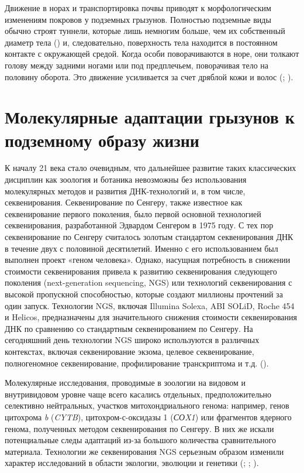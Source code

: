 
Движение в норах и транспортировка почвы приводят к морфологическим изменениям покровов у подземных грызунов. Полностью подземные виды обычно строят туннели, которые лишь немногим больше, чем их собственный диаметр тела (\cite{Andersen1982}) и, следовательно, поверхность тела находится в постоянном контакте с окружающей средой. Когда особи поворачиваются в норе, они толкают голову между задними ногами или под предплечьем, поворачивая тело на половину оборота. Это движение усиливается за счет дряблой кожи и волос (\cite{Nevo1979}; \cite{Tucker1981}). 

\section{Молекулярные адаптации грызунов к подземному образу жизни}

К началу 21 века стало очевидным, что дальнейшее развитие таких классических дисциплин как зоология и ботаника невозможны без использования молекулярных методов и развития ДНК-технологий и, в том числе, секвенирования. Секвенирование по Сенгеру, также известное как секвенирование первого поколения, было первой основной технологией секвенирования, разработанной Эдвардом Сенгером в 1975 году. С тех пор секвенирование по Сенгеру считалось золотым стандартом секвенирования ДНК в течение двух с половиной десятилетий. Именно с его использованием был выполнен проект «геном человека». Однако, насущная потребность в снижении стоимости секвенирования привела к развитию секвенирования следующего поколения (next-generation sequencing, NGS) или технологий секвенирования с высокой пропускной способностью, которые создают миллионы прочтений за один запуск. Технологии NGS, включая Illumina Solexa, ABI SOLiD, Roche 454 и Helicos, предназначены для значительного снижения стоимости секвенирования ДНК по сравнению со стандартным секвенированием по Сенгеру. На сегодняшний день технологии NGS широко используются в различных контекстах, включая секвенирование экзома, целевое секвенирование, полногеномное секвенирование, профилирование транскриптома и т.д. (\cite{Fang2015}).
 
Молекулярные исследования, проводимые в зоологии на видовом и внутривидовом уровне чаще всего касались отдельных, предположительно селективно нейтральных, участков митохондриального генома: например, генов цитохрома \textit{b} (\textit{CYTB}), цитохром-с-оксидазы 1 (\textit{СОX1}) или фрагментов ядерного генома, полученных методом секвенирования по Сенгеру. В них же искали потенциальные следы адаптаций из-за большого количества сравнительного материала. Технологии же секвенирования NGS серьезным образом изменили характер исследований в области экологии, эволюции и генетики (\cite{Hudson2008}; \cite{Stapley2010}; \cite{Rokas2009}).

